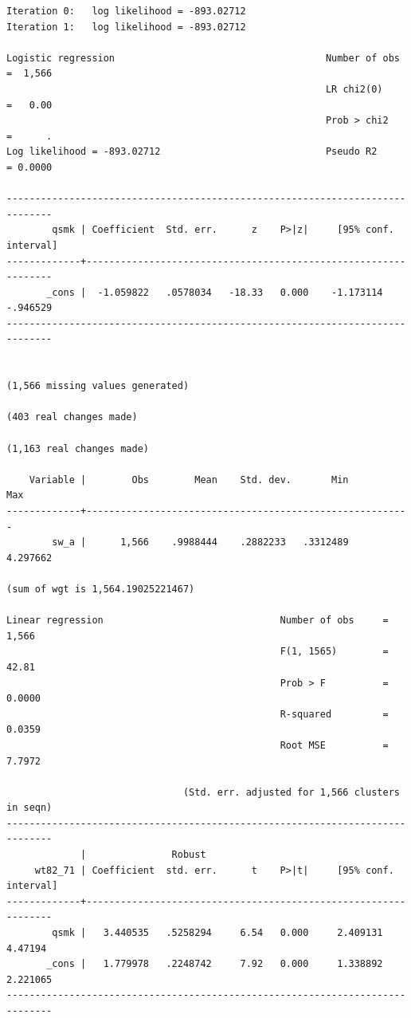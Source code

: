 \documentclass[
  10pt,
]{book}
\begin{document}
\begin{verbatim}
Iteration 0:   log likelihood = -893.02712  
Iteration 1:   log likelihood = -893.02712  

Logistic regression                                     Number of obs =  1,566
                                                        LR chi2(0)    =   0.00
                                                        Prob > chi2   =      .
Log likelihood = -893.02712                             Pseudo R2     = 0.0000

------------------------------------------------------------------------------
        qsmk | Coefficient  Std. err.      z    P>|z|     [95% conf. interval]
-------------+----------------------------------------------------------------
       _cons |  -1.059822   .0578034   -18.33   0.000    -1.173114    -.946529
------------------------------------------------------------------------------


(1,566 missing values generated)

(403 real changes made)

(1,163 real changes made)

    Variable |        Obs        Mean    Std. dev.       Min        Max
-------------+---------------------------------------------------------
        sw_a |      1,566    .9988444    .2882233   .3312489   4.297662

(sum of wgt is 1,564.19025221467)

Linear regression                               Number of obs     =      1,566
                                                F(1, 1565)        =      42.81
                                                Prob > F          =     0.0000
                                                R-squared         =     0.0359
                                                Root MSE          =     7.7972

                               (Std. err. adjusted for 1,566 clusters in seqn)
------------------------------------------------------------------------------
             |               Robust
     wt82_71 | Coefficient  std. err.      t    P>|t|     [95% conf. interval]
-------------+----------------------------------------------------------------
        qsmk |   3.440535   .5258294     6.54   0.000     2.409131     4.47194
       _cons |   1.779978   .2248742     7.92   0.000     1.338892    2.221065
------------------------------------------------------------------------------


\end{verbatim}
\end{document}
